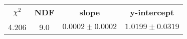 \begin{tabular}{|c|c|c|c|}

\hline
$\chi^{2}$ & NDF & slope & y-intercept  \\
\hline
4.206 & 9.0 & $0.0002\pm0.0002$ & $1.0199\pm0.0319$ \\
\hline

\end{tabular}